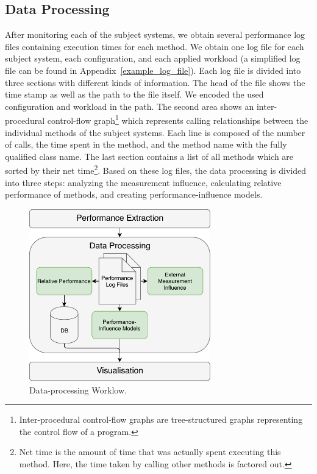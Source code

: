 \subsection{Data Processing}
\label{data_prozessing}

After monitoring each of the subject systems, we obtain several performance log files containing execution times for each method. We obtain one log file for each subject system, each configuration, and each applied workload (a simplified log file can be found in Appendix~\ref{example_log_file}). Each log file is divided into three sections with different kinds of information. The head of the file shows the time stamp as well as the path to the file itself. We encoded the used configuration and workload in the path. The second area shows an inter-procedural control-flow graph\footnote{Inter-procedural control-flow graphs are tree-structured graphs representing the control flow of a program.} which represents calling relationships between the individual methods of the subject systems. Each line is composed of the number of calls, the time spent in the method, and the method name with the fully qualified class name. The last section contains a list of all methods which are sorted by their net time\footnote{Net time is the amount of time that was actually spent executing this method. Here, the time taken by calling other methods is factored out.}. Based on these log files, the data processing is divided into three steps: analyzing the measurement influence, calculating relative performance of methods, and creating performance-influence models.


\begin{figure}
  \centering
  \includegraphics[width=0.7\textwidth]{images/workflow_data_expanded}
  \caption{Data-processing Worklow.}
  \label{data_processing_workflow}
\end{figure}


